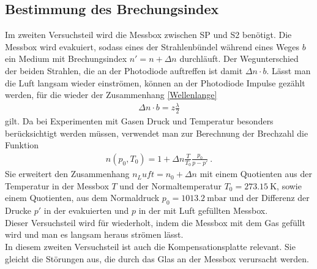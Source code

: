 \subsection*{Bestimmung des Brechungsindex}
Im zweiten Versuchsteil wird die Messbox zwischen SP und S2 benötigt. Die Messbox wird evakuiert, sodass eines der Strahlenbündel während eines Weges $b$ ein Medium mit Brechungsindex $n' = n + \Delta n$ durchläuft. Der Wegunterschied der beiden Strahlen, die an der Photodiode auftreffen ist damit $\Delta n\cdot b$. Lässt man die Luft langsam wieder einströmen, können an der Photodiode Impulse gezählt werden, für die wieder der Zusammenhang \eqref{Wellenlange}
\begin{align}\label{brechungsindex1}
	\Delta n\cdot b = z \frac{\lambda}{2}
\end{align}
gilt. Da bei Experimenten mit Gasen Druck und Temperatur besonders berücksichtigt werden müssen, verwendet man zur Berechnung der Brechzahl die Funktion
\begin{align}\label{brechungsindex}
	n(p_0,T_0) = 1 + \Delta n\frac{T}{T_0}\frac{p_0}{p-p'} \ .
\end{align}
Sie erweitert den Zusammenhang $n_Luft = n_0+\Delta n$ mit einem Quotienten aus der Temperatur in der Messbox $T$ und der Normaltemperatur $T_0=\SI{273.15}{\kelvin}$, sowie einem Quotienten, aus dem Normaldruck $p_0=\SI{1013.2}{\milli\bar}$ und der Differenz der Drucke $p'$ in der evakuierten und $p$ in der mit Luft gefüllten Messbox. \\
Dieser Versuchsteil wird für  wiederholt, indem die Messbox mit dem Gas gefüllt wird und man es langsam heraus strömen lässt. \\
In diesem zweiten Versuchsteil ist auch die Kompensationsplatte relevant. Sie gleicht die Störungen aus, die durch das Glas an der Messbox verursacht werden.